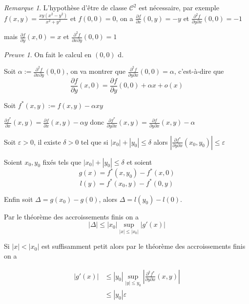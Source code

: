 \documentclass[]{article}
\theoremstyle{remark}
\newtheorem{myrem}{Remarque}
\newtheorem{myproof}{Preuve}
\theoremstyle{definition}
\begin{document}
\begin{myrem}
	L'hypothèse d'être de classe $\mathcal{C^2}$ est nécessaire, par exemple $f(x, y) = \frac{xy(x^2 - y^2)}{x^2 + y^2}$ et $f(0, 0) = 0$, on a $\displaystyle \frac{\partial f}{\partial x}(0, y) = -y$ et $\displaystyle \frac{\partial^2 f}{\partial y \partial x}(0, 0) = -1$
	
	mais $\displaystyle \frac{\partial f}{\partial y}(x, 0) = x$ et $\displaystyle \frac{\partial^2 f}{\partial x \partial y}(0, 0) = 1$
\end{myrem}

\begin{myproof}
		On fait le calcul en $(0, 0)$ d.
		
		Soit $\displaystyle \alpha := \frac{\partial^2 f}{\partial x \partial y}(0, 0)$, on va montrer que $\displaystyle \frac{\partial^2 f}{\partial y \partial x}(0, 0) = \alpha$, c'est-à-dire que $$\frac{\partial f}{\partial y}(x, 0) = \frac{\partial f}{\partial y}(0, 0) + \alpha x + o(x)$$
		
		Soit $f^*(x, y) := f(x, y) - \alpha xy$
		
		$\displaystyle \frac{\partial f^*}{\partial x}(x, y) = \frac{\partial f}{\partial x}(x, y) - \alpha y$ donc $\displaystyle \frac{\partial f^*}{\partial y \partial x}(x, y) = \frac{\partial f}{\partial y \partial x}(x, y) - \alpha$
		
		Soit $\varepsilon > 0$, il existe $\delta > 0$ tel que si $|x_0| + |y_0| \leqslant \delta$ alors $\displaystyle \left|\frac{\partial f^*}{\partial y \partial x}(x_0, y_0)\right| \leqslant\varepsilon$
		
		Soient $x_0, y_0$ fixés tels que $|x_0| + |y_0| \leqslant \delta$ et soient $$g(x) = f^*(x, y_0) - f^*(x, 0)$$
		$$l(y) = f^*(x_0, y) - f^*(0, y)$$
		
		Enfin soit $\Delta = g(x_0) - g(0)$, alors $\Delta = l(y_0) - l(0)$.
		
		Par le théorème des accroissements finis on a
		$$|\Delta| \leqslant |x_0| \sup_{|x| \leqslant |x_0|} |g'(x)|$$
		
		Si $|x| < |x_0|$ est suffisamment petit alors par le théorème des accroissements finis on a
		
		$$\begin{aligned}
			|g'(x)| &\leqslant |y_0|\sup_{|y| \leqslant y_0} \left|\frac{\partial^2 f^*}{\partial y\partial x}(x, y)\right|\\
			&\leqslant |y_0| \varepsilon
		\end{aligned}$$
		

\end{myproof}
\end{document}
